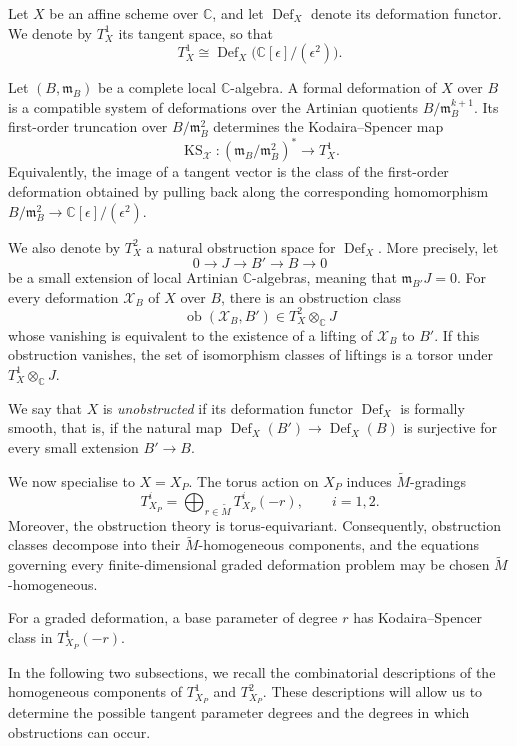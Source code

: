 \documentclass[11pt]{amsart}
\numberwithin{equation}{section}
\theoremstyle{plain}
\theoremstyle{definition}
\newcommand{\0}{$0$-mutable}
\newcommand{\CC}{\ensuremath{\mathbb{C}}}
\renewcommand{\1}{$1$-rigid}
\renewcommand{\0}{$0$-mutable}
\newcommand{\KS}{\operatorname{KS}}
\newcommand{\Def}{\operatorname{Def}}
\begin{document}
Let \(X\) be an affine scheme over \(\CC\), and let
\(\Def_X\) denote its deformation functor. We denote by \(T_X^1\) its
tangent space, so that
\[
T_X^1
\cong
\Def_X\bigl(\CC[\epsilon]/(\epsilon^2)\bigr).
\]

{
Let \((B,\mathfrak m_B)\) be a complete local \(\CC\)-algebra. A
formal deformation of \(X\) over \(B\) is a compatible system of
deformations over the Artinian quotients
\(B/\mathfrak m_B^{k+1}\). Its first-order truncation over
\(B/\mathfrak m_B^2\) determines the Kodaira--Spencer map
\[
\KS_{\mathcal X}\colon
(\mathfrak m_B/\mathfrak m_B^2)^\ast
\longrightarrow T_X^1.
\]
Equivalently, the image of a tangent vector is the class of the
first-order deformation obtained by pulling back along the
corresponding homomorphism
\(B/\mathfrak m_B^2\to\CC[\epsilon]/(\epsilon^2)\).
}

We also denote by \(T_X^2\) a natural obstruction space for
\(\Def_X\). 
More precisely, let
\[
0\longrightarrow J
\longrightarrow B'
\longrightarrow B
\longrightarrow0
\]
be a small extension of local Artinian \(\CC\)-algebras, meaning that
$\mathfrak m_{B'}J=0.$
For every deformation \(\mathcal X_B\) of \(X\) over \(B\), there is
an obstruction class
\[
\operatorname{ob}(\mathcal X_B,B')
\in
T_X^2\otimes_{\CC}J
\]
whose vanishing is equivalent to the existence of a lifting of
\(\mathcal X_B\) to \(B'\). If this obstruction vanishes, the set of
isomorphism classes of liftings is a torsor under
$
T_X^1\otimes_{\CC}J.
$

We say that \(X\) is \emph{unobstructed} if its deformation functor
\(\Def_X\) is formally smooth, that is, if the natural map
$
\Def_X(B')
\longrightarrow
\Def_X(B)
$
is surjective for every small extension \(B'\to B\).



We now specialise to \(X=X_P\). The torus action on \(X_P\) induces
\(\widetilde M\)-gradings
\[
T^i_{X_P}
=
\bigoplus_{r\in\widetilde M}
T^i_{X_P}(-r),
\qquad i=1,2.
\]
Moreover, the obstruction theory is torus-equivariant. Consequently,
obstruction classes decompose into their \(\widetilde M\)-homogeneous
components, and the equations governing every finite-dimensional
graded deformation problem may be chosen
\(\widetilde M\)-homogeneous.

{For a graded deformation, a base parameter of degree \(r\) has
Kodaira--Spencer class in \(T^1_{X_P}(-r)\).}


In the following two subsections, we recall the combinatorial
descriptions of the homogeneous components of \(T^1_{X_P}\) and
\(T^2_{X_P}\). These descriptions will allow us to determine the
possible tangent parameter degrees and the degrees in which
obstructions can occur.
\end{document}

